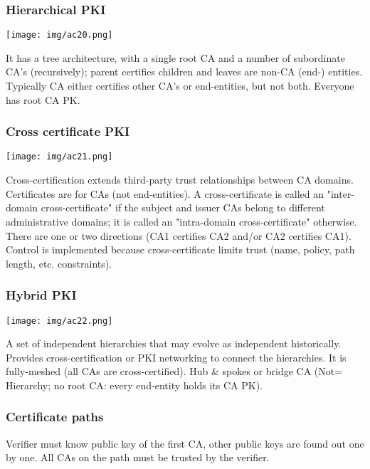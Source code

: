 \documentclass[a4paper, 10pt, titlepage]{article}
\begin{document}
\subsubsection*{Hierarchical PKI}
\begin{center}
\texttt{[image: img/ac20.png]}
\end{center}
It has a tree architecture, with a single root CA and a number of subordinate CA’s (recursively); parent certifies children and leaves are non-CA (end-) entities.
Typically CA either certifies other CA’s or end-entities, but not both. Everyone has root CA PK.

\subsubsection*{Cross certificate PKI}
\begin{center}
\texttt{[image: img/ac21.png]}
\end{center}
Cross-certification extends third-party trust relationships between CA domains. Certificates are for CAs (not end-entities).  A cross-certificate is called an "inter-domain cross-certificate" if the subject and issuer CAs belong to different administrative domains; it is called an "intra-domain cross-certificate" otherwise.
There are one or two directions (CA1 certifies CA2 and/or CA2 certifies CA1). Control is implemented because cross-certificate limits trust (name, policy, path length, etc. constraints).

\subsubsection*{Hybrid PKI}
\begin{center}
\texttt{[image: img/ac22.png]}
\end{center}
A set of independent hierarchies that may evolve as independent historically. Provides cross-certification or PKI networking to connect the hierarchies. It is fully-meshed  (all CAs are cross-certified). Hub \& spokes or bridge CA (Not= Hierarchy; no root CA: every end-entity holds its CA PK). %

\subsubsection{Certificate paths}
Verifier must know public key of the first CA, other public keys are found out one by one. All CAs on the path must be trusted by the verifier.
\end{document}

